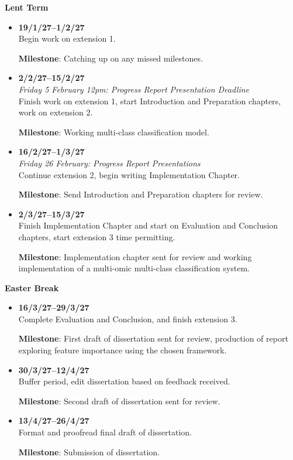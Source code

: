 \documentclass[12pt,a4paper]{report}
\begin{document}
\textbf{Lent Term}
\begin{itemize}
    \item \textbf{19/1/27--1/2/27} \\
    Begin work on extension 1. 
    
    \textbf{Milestone}: Catching up on any missed milestones.
    \item \textbf{2/2/27--15/2/27} \\
    \textit{Friday 5 February 12pm: Progress Report Presentation Deadline} \\
    Finish work on extension 1, start Introduction and Preparation chapters, work on extension 2. 
    
    \textbf{Milestone}: Working multi-class classification model.
    \item \textbf{16/2/27--1/3/27} \\
    \textit{Friday 26 February: Progress Report Presentations}\\
    Continue extension 2, begin writing Implementation Chapter.
    
    \textbf{Milestone}: Send Introduction and Preparation chapters for review.
    \item \textbf{2/3/27--15/3/27} \\
    Finish Implementation Chapter and start on Evaluation and Conclusion chapters, start extension 3 time permitting.
    
    \textbf{Milestone}: Implementation chapter sent for review and working implementation of a multi-omic multi-class classification system.

\end{itemize}
\textbf{Easter Break} \\ 
\begin{itemize}
    \item \textbf{16/3/27--29/3/27} \\
    Complete Evaluation and Conclusion, and finish extension 3.
    
    \textbf{Milestone}: First draft of dissertation sent for review, production of report exploring feature importance using the chosen framework.
    \item \textbf{30/3/27--12/4/27} \\
Buffer period, edit dissertation based on feedback received. 

\textbf{Milestone}: Second draft of dissertation sent for review.
    \item \textbf{13/4/27--26/4/27} \\
Format and proofread final draft of dissertation.

\textbf{Milestone}: Submission of dissertation.\\
\end{itemize}
\end{document}
